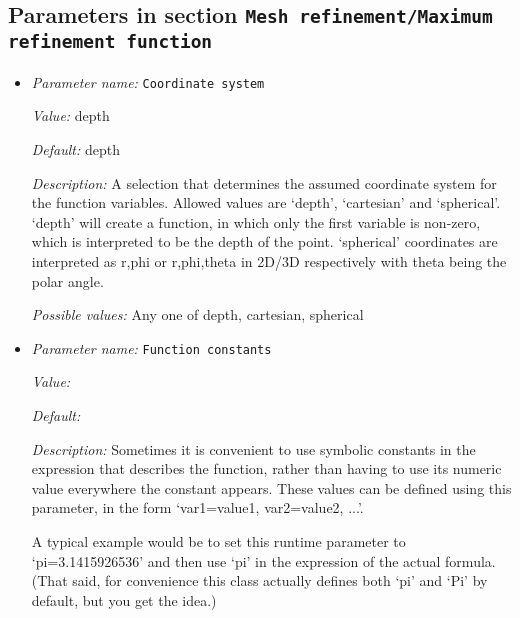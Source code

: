 \subsection{Parameters in section \tt Mesh refinement/Maximum refinement function}
\label{parameters:Mesh_20refinement/Maximum_20refinement_20function}

\begin{itemize}
\item {\it Parameter name:} {\tt Coordinate system}
\label{parameters:Mesh refinement/Maximum refinement function/Coordinate system}
\label{parameters:Mesh_20refinement/Maximum_20refinement_20function/Coordinate_20system}


{\it Value:} depth


{\it Default:} depth


{\it Description:} A selection that determines the assumed coordinate system for the function variables. Allowed values are `depth', `cartesian' and `spherical'. `depth' will create a function, in which only the first variable is non-zero, which is interpreted to be the depth of the point. `spherical' coordinates are interpreted as r,phi or r,phi,theta in 2D/3D respectively with theta being the polar angle.


{\it Possible values:} Any one of depth, cartesian, spherical
\item {\it Parameter name:} {\tt Function constants}
\label{parameters:Mesh refinement/Maximum refinement function/Function constants}
\label{parameters:Mesh_20refinement/Maximum_20refinement_20function/Function_20constants}


{\it Value:} 


{\it Default:} 


{\it Description:} Sometimes it is convenient to use symbolic constants in the expression that describes the function, rather than having to use its numeric value everywhere the constant appears. These values can be defined using this parameter, in the form `var1=value1, var2=value2, ...'.

A typical example would be to set this runtime parameter to `pi=3.1415926536' and then use `pi' in the expression of the actual formula. (That said, for convenience this class actually defines both `pi' and `Pi' by default, but you get the idea.)



\end{itemize}
